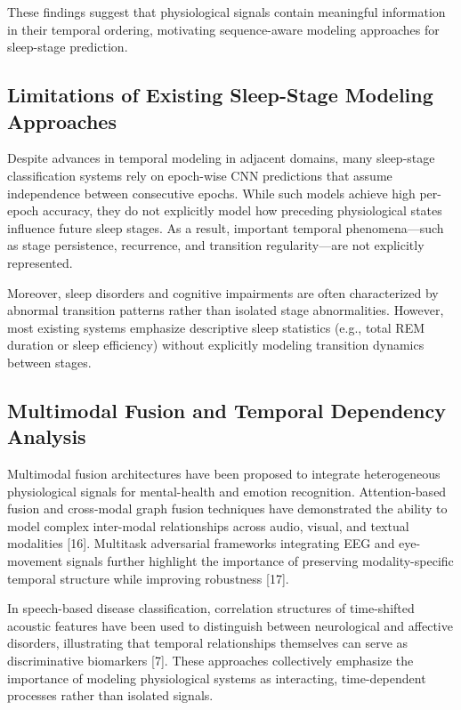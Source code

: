\documentclass[10pt]{cai26}
\begin{document}
These findings suggest that physiological signals contain meaningful information in their temporal ordering, motivating sequence-aware modeling approaches for sleep-stage prediction.

\subsection{Limitations of Existing Sleep-Stage Modeling Approaches}

Despite advances in temporal modeling in adjacent domains, many sleep-stage classification systems rely on epoch-wise CNN predictions that assume independence between consecutive epochs. While such models achieve high per-epoch accuracy, they do not explicitly model how preceding physiological states influence future sleep stages. As a result, important temporal phenomena---such as stage persistence, recurrence, and transition regularity---are not explicitly represented.

Moreover, sleep disorders and cognitive impairments are often characterized by abnormal transition patterns rather than isolated stage abnormalities. However, most existing systems emphasize descriptive sleep statistics (e.g., total REM duration or sleep efficiency) without explicitly modeling transition dynamics between stages.

\subsection{Multimodal Fusion and Temporal Dependency Analysis}

Multimodal fusion architectures have been proposed to integrate heterogeneous physiological signals for mental-health and emotion recognition. Attention-based fusion and cross-modal graph fusion techniques have demonstrated the ability to model complex inter-modal relationships across audio, visual, and textual modalities [16]. Multitask adversarial frameworks integrating EEG and eye-movement signals further highlight the importance of preserving modality-specific temporal structure while improving robustness [17].

In speech-based disease classification, correlation structures of time-shifted acoustic features have been used to distinguish between neurological and affective disorders, illustrating that temporal relationships themselves can serve as discriminative biomarkers [7]. These approaches collectively emphasize the importance of modeling physiological systems as interacting, time-dependent processes rather than isolated signals.
\end{document}
